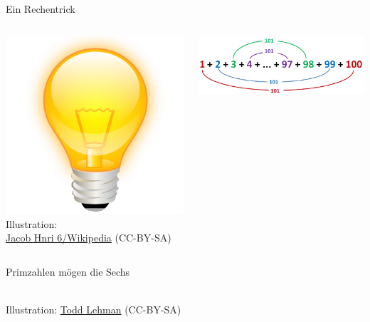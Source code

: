\documentclass[12pt,compress,ngerman,utf8,t]{beamer}
\newcommand{\withsource}[2]{\begin{center}#1\\\tiny #2\end{center}}
\begin{document}
\begin{frame}{Ein Rechentrick}
  \begin{columns}[c]
    \begin{column}{0.2\textwidth}
      \withsource{
        \includegraphics[width=\textwidth]{idea}
      }{
        Illustration: \\
        \href{https://commons.wikimedia.org/wiki/File:Crystal_Clear_app_ktip.svg}{Jacob
        Hnri 6/Wikipedia} (CC-BY-SA)
      }
    \end{column}

    \begin{column}{0.7\textwidth}
      \includegraphics[width=\textwidth]{kleiner-gauss}
    \end{column}
  \end{columns}
\end{frame}

\begin{frame}{Primzahlen mögen die Sechs}
  \centering
  \vspace*{-0.5em}
  \withsource{}{Illustration:
  \href{https://tex.stackexchange.com/a/44920/32372}{Todd Lehman} (CC-BY-SA)}
\end{frame}
\end{document}
